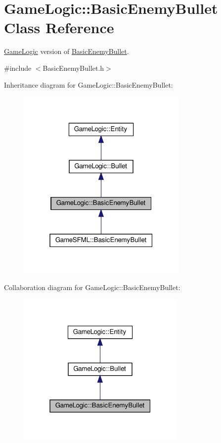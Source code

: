 \hypertarget{classGameLogic_1_1BasicEnemyBullet}{}\section{Game\+Logic\+:\+:Basic\+Enemy\+Bullet Class Reference}
\label{classGameLogic_1_1BasicEnemyBullet}


\hyperlink{namespaceGameLogic}{Game\+Logic} version of \hyperlink{classGameLogic_1_1BasicEnemyBullet}{Basic\+Enemy\+Bullet}.  




{\ttfamily \#include $<$Basic\+Enemy\+Bullet.\+h$>$}



Inheritance diagram for Game\+Logic\+:\+:Basic\+Enemy\+Bullet\+:
\nopagebreak
\begin{figure}[H]
\begin{center}
\leavevmode
\includegraphics[width=235pt]{classGameLogic_1_1BasicEnemyBullet__inherit__graph}
\end{center}
\end{figure}


Collaboration diagram for Game\+Logic\+:\+:Basic\+Enemy\+Bullet\+:\nopagebreak
\begin{figure}[H]
\begin{center}
\leavevmode
\includegraphics[width=232pt]{classGameLogic_1_1BasicEnemyBullet__coll__graph}
\end{center}
\end{figure}
